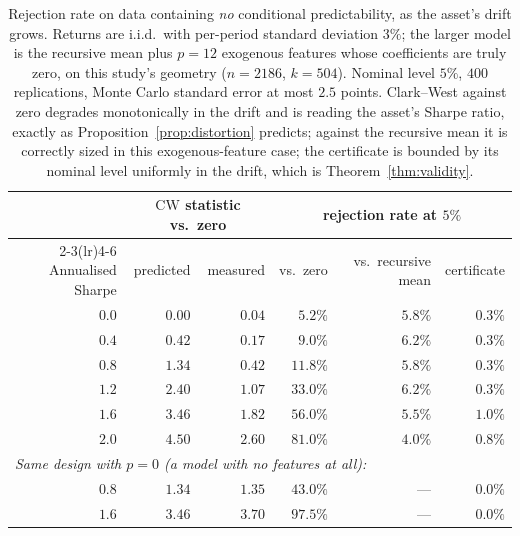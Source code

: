 \documentclass{article}
\theoremstyle{plain}
\theoremstyle{definition}
\begin{document}
\begin{table}[t]
  \centering
  \caption{Rejection rate on data containing \emph{no} conditional predictability, as the
  asset's drift grows. Returns are i.i.d.\ with per-period standard deviation $3\%$; the
  larger model is the recursive mean plus $p=12$ exogenous features whose coefficients are
  truly zero, on this study's geometry ($n=2186$, $k=504$). Nominal level $5\%$, $400$
  replications, Monte Carlo standard error at most $2.5$ points. Clark--West against zero
  degrades monotonically in the drift and is reading the asset's Sharpe ratio, exactly as
  Proposition~\ref{prop:distortion} predicts; against the recursive mean it is correctly
  sized in this exogenous-feature case; the certificate is bounded by its nominal level
  uniformly in the drift, which is Theorem~\ref{thm:validity}.}
  \label{tab:sweep}
  \small
  \begin{tabular}{rrrrrr}
    \toprule
    & \multicolumn{2}{c}{$\mathrm{CW}$ statistic vs.\ zero}
    & \multicolumn{3}{c}{rejection rate at $5\%$} \\
    \cmidrule(lr){2-3}\cmidrule(lr){4-6}
    Annualised Sharpe & predicted & measured
    & vs.\ zero & vs.\ recursive mean & certificate \\
    \midrule
    $0.0$ & $0.00$ & $0.04$ & $5.2\%$  & $5.8\%$ & $0.3\%$ \\
    $0.4$ & $0.42$ & $0.17$ & $9.0\%$  & $6.2\%$ & $0.3\%$ \\
    $0.8$ & $1.34$ & $0.42$ & $11.8\%$ & $5.8\%$ & $0.3\%$ \\
    $1.2$ & $2.40$ & $1.07$ & $33.0\%$ & $6.2\%$ & $0.3\%$ \\
    $1.6$ & $3.46$ & $1.82$ & $56.0\%$ & $5.5\%$ & $1.0\%$ \\
    $2.0$ & $4.50$ & $2.60$ & $81.0\%$ & $4.0\%$ & $0.8\%$ \\
    \midrule
    \multicolumn{6}{l}{\emph{Same design with $p=0$ (a model with no features at all):}} \\
    $0.8$ & $1.34$ & $1.35$ & $43.0\%$ & --- & $0.0\%$ \\
    $1.6$ & $3.46$ & $3.70$ & $97.5\%$ & --- & $0.0\%$ \\
    \bottomrule
  \end{tabular}
\end{table}
\end{document}

